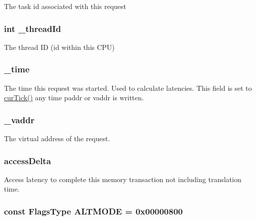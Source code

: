 \label{classRequest_a26b7e95ff0ac1179f5e53088c59a24bb}
The task id associated with this request \hypertarget{classRequest_a4b170276468a329fe4b63ca0ebcb390d}{
\subsubsection[{\_\-threadId}]{\setlength{\rightskip}{0pt plus 5cm}int {\bf \_\-threadId}}}
\label{classRequest_a4b170276468a329fe4b63ca0ebcb390d}
The thread ID (id within this CPU) \hypertarget{classRequest_a848722ed50c2d59ce4204882e4ea21b6}{
\subsubsection[{\_\-time}]{ {\bf \_\-time}}}
\label{classRequest_a848722ed50c2d59ce4204882e4ea21b6}
The time this request was started. Used to calculate latencies. This field is set to \hyperlink{statistics_8hh_a7acdccbf0d35ce0c159c0cdd36371b22}{curTick()} any time paddr or vaddr is written. \hypertarget{classRequest_a7a230e408dae69495842b5941bb795b1}{
\subsubsection[{\_\-vaddr}]{ {\bf \_\-vaddr}}}
\label{classRequest_a7a230e408dae69495842b5941bb795b1}
The virtual address of the request. \hypertarget{classRequest_aa559a89e151ecba54621f0360fa1e6a3}{
\subsubsection[{accessDelta}]{ {\bf accessDelta}}}
\label{classRequest_aa559a89e151ecba54621f0360fa1e6a3}
Access latency to complete this memory transaction not including translation time. \hypertarget{classRequest_af5696d6c4c536a1c16a3fce36b9741c4}{
\subsubsection[{ALTMODE}]{\setlength{\rightskip}{0pt plus 5cm}const {\bf FlagsType} {\bf ALTMODE} = 0x00000800}}
